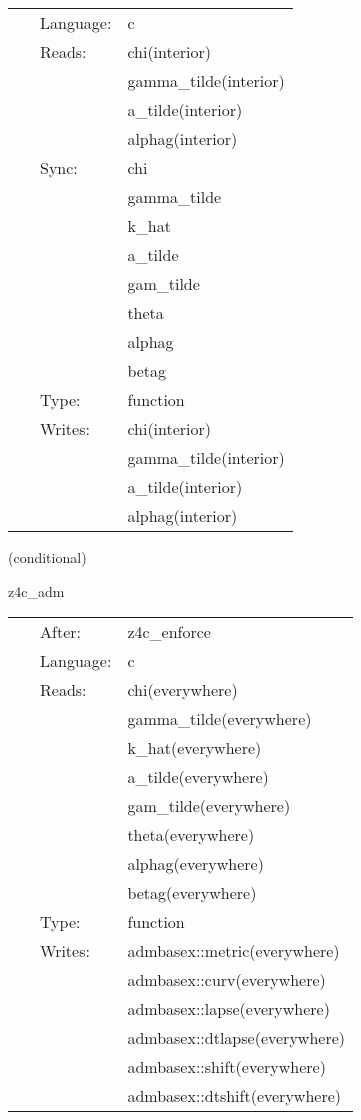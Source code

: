 \hspace{5mm}

 \begin{tabular*}{160mm}{cll} 
~ & Language:  & c \\ 
~ & Reads:  & chi(interior) \\ 
~& ~ &gamma\_tilde(interior)\\ 
~& ~ &a\_tilde(interior)\\ 
~& ~ &alphag(interior)\\ 
~ & Sync:  & chi \\ 
~& ~ &gamma\_tilde\\ 
~& ~ &k\_hat\\ 
~& ~ &a\_tilde\\ 
~& ~ &gam\_tilde\\ 
~& ~ &theta\\ 
~& ~ &alphag\\ 
~& ~ &betag\\ 
~ & Type:  & function \\ 
~ & Writes:  & chi(interior) \\ 
~& ~ &gamma\_tilde(interior)\\ 
~& ~ &a\_tilde(interior)\\ 
~& ~ &alphag(interior)\\ 
\end{tabular*} 


\vspace{5mm}

   (conditional) 

\hspace{5mm} z4c\_adm 

\hspace{5mm}{\it convert z4c to adm variables } 


\hspace{5mm}

 \begin{tabular*}{160mm}{cll} 
~ & After:  & z4c\_enforce \\ 
~ & Language:  & c \\ 
~ & Reads:  & chi(everywhere) \\ 
~& ~ &gamma\_tilde(everywhere)\\ 
~& ~ &k\_hat(everywhere)\\ 
~& ~ &a\_tilde(everywhere)\\ 
~& ~ &gam\_tilde(everywhere)\\ 
~& ~ &theta(everywhere)\\ 
~& ~ &alphag(everywhere)\\ 
~& ~ &betag(everywhere)\\ 
~ & Type:  & function \\ 
~ & Writes:  & admbasex::metric(everywhere) \\ 
~& ~ &admbasex::curv(everywhere)\\ 
~& ~ &admbasex::lapse(everywhere)\\ 
~& ~ &admbasex::dtlapse(everywhere)\\ 
~& ~ &admbasex::shift(everywhere)\\ 
~& ~ &admbasex::dtshift(everywhere)\\ 
\end{tabular*} 


